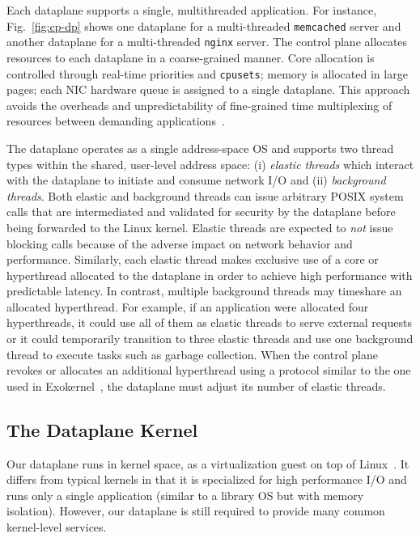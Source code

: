 Each \ix dataplane supports a single, multithreaded
application. For instance, Fig.~\ref{fig:cp-dp} shows one dataplane
for a multi-threaded \texttt{memcached} server and another dataplane
for a multi-threaded \texttt{nginx} server. The control plane allocates
resources to each dataplane in a coarse-grained manner. Core allocation
is controlled through real-time priorities and \texttt{cpusets};
memory is allocated in large pages; each NIC hardware queue is
assigned to a single dataplane. This approach avoids the overheads and
unpredictability of fine-grained time multiplexing of resources between
demanding applications~\cite{DBLP:conf/eurosys/LeverichK14}.

The \ix dataplane operates as a single address-space OS and supports
two thread types within the shared, user-level address space: (i)
\emph{elastic threads} which interact with the \ix dataplane to
initiate and consume network I/O and (ii) \emph{background threads}.
Both elastic and background threads can issue arbitrary POSIX system
calls that are intermediated and validated for security by the
dataplane before being forwarded to the Linux kernel.  Elastic
threads are expected to \emph{not} issue blocking calls because of the
adverse impact on network behavior and performance. Similarly, each
elastic thread makes exclusive use of a core or hyperthread allocated
to the dataplane in order to achieve high performance with predictable
latency. In contrast, multiple background threads may timeshare an
allocated hyperthread. For example, if an application were
allocated four hyperthreads, it could use all of them as elastic
threads to serve external requests or it could temporarily transition
to three elastic threads and use one background thread to execute
tasks such as garbage collection. When the control plane revokes or
allocates an additional hyperthread using a protocol similar to the
one used in Exokernel~\cite{DBLP:conf/sosp/EnglerKO95}, the dataplane
must adjust its number of elastic threads.


\subsection{The Dataplane Kernel}
\label{sec:impl:dpkernel}

Our dataplane runs in kernel space, as a virtualization guest on
top of Linux~\cite{dune}. It differs from typical kernels
in that it is specialized for high performance I/O and runs only
a single application (similar to a library OS but with memory
isolation). However, our dataplane is still required to provide
many common kernel-level services.

